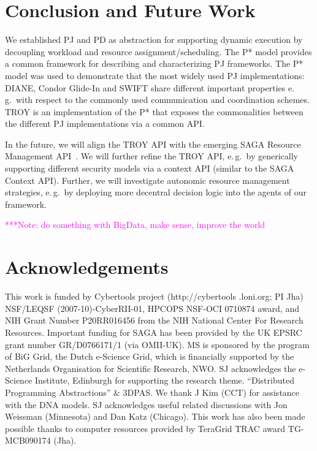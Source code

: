 \documentclass[conference,final]{IEEEtran}
\newcommand{\note}[1]{ {\textcolor{magenta} { ***Note: #1 }}}
\newcommand{\note}[1]{}
\newcommand{\upp}{\vspace*{-0.5em}}
\begin{document}

\upp


\section{Conclusion and Future Work\upp\upp}

We established PJ and PD as abstraction for supporting dynamic execution by
decoupling workload and resource assignment/scheduling. The P* model provides a
common framework for describing and characterizing PJ frameworks. The P* model
was used to demonstrate that the most widely used PJ implementations:
DIANE, Condor Glide-In and SWIFT share different important properties e.\,g.\ with
respect to the commonly used communication and coordination schemes. TROY is an
implementation of the P* that exposes the commonalities between the different PJ
implementations via a common API.

In the future, we will align the TROY API with the emerging SAGA Resource
Management API~\cite{saga_rm}. We will further refine the TROY API, e.\,g.\ by
generically supporting different security models via a context API (similar to
the SAGA Context API). Further, we will investigate autonomic resource
management strategies, e.\,g.\ by deploying more decentral decision logic into
the agents of our framework.



\note{do something with BigData, make sense, improve the world}

\section*{Acknowledgements\upp\upp}
\footnotesize{This work is funded by Cybertools project
  (http://cybertools .loni.org; PI Jha) NSF/LEQSF
  (2007-10)-CyberRII-01, HPCOPS NSF-OCI 0710874 award, and NIH Grant
  Number P20RR016456 from the NIH National Center For Research
  Resources. Important funding for SAGA has been provided by the UK
  EPSRC grant number GR/D0766171/1 (via OMII-UK).  MS is sponsored by
  the program of BiG Grid, the Dutch e-Science Grid, which is
  financially supported by the Netherlands Organisation for Scientific
  Research, NWO. SJ acknowledges the e-Science Institute, Edinburgh
  for supporting the research theme. ``Distributed Programming
  Abstractions'' \& 3DPAS. We thank J Kim (CCT) for assistance with
  the DNA models.  SJ acknowledges useful related discussions with Jon
  Weissman (Minnesota) and Dan Katz (Chicago). This work has also been
  made possible thanks to computer resources provided by TeraGrid TRAC
  award TG-MCB090174 (Jha). } 

\end{document}
